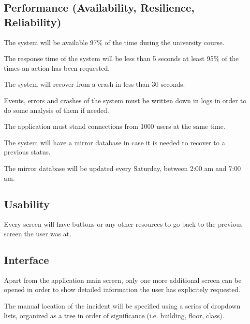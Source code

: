 \subsection{Performance (Availability, Resilience, Reliability)}
\begin{NFrequirement}{}
The system will be available 97\% of the time during the university course.
\end{NFrequirement}
\begin{NFrequirement}{}
The response time of the system will be less than 5 seconds at least 95\% of the times an action has been requested.
\end{NFrequirement}
\begin{NFrequirement}{}
The system will recover from a crash in less than 30 seconds.
\end{NFrequirement}
\begin{NFrequirement}{}
Events, errors and crashes of the system must be written down in logs in order to do some analysis of them if needed.
\end{NFrequirement}
\begin{NFrequirement}{}
The application must stand connections from 1000 users at the same time.
\end{NFrequirement}
\begin{NFrequirement}{}
The system will have a mirror database in case it is needed to recover to a previous status.
\end{NFrequirement}
\begin{NFrequirement}{}
The mirror database will be updated every Saturday, between 2:00 am and 7:00 am.
\end{NFrequirement}

\subsection{Usability}
\begin{NFrequirement}{}
Every screen will have buttons or any other resources to go back to the previous screen the user was at.
\end{NFrequirement}

\subsection{Interface}
\begin{NFrequirement}{}
Apart from the application main screen, only one more additional screen can be opened in order to show detailed information the user has explicitely requested.
\end{NFrequirement}
\begin{NFrequirement}{}
The manual location of the incident will be specified using a series of dropdown lists, organized as a tree in order of significance (i.e. building, floor, class).
\end{NFrequirement}

